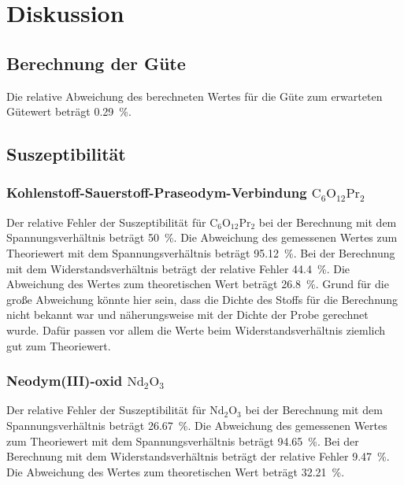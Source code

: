 \section{Diskussion}
\label{sec:Diskussion}

\subsection{Berechnung der Güte}
Die relative Abweichung des berechneten Wertes für die Güte zum erwarteten Gütewert beträgt \SI{0.29}{\percent}. 

\subsection{Suszeptibilität}
\subsubsection{Kohlenstoff-Sauerstoff-Praseodym-Verbindung $\text{C}_6 \text{O}_{12} \text{Pr}_2$}
Der relative Fehler der Suszeptibilität für $\text{C}_6 \text{O}_{12} \text{Pr}_2$ bei der Berechnung mit dem Spannungsverhältnis beträgt \SI{50}{\percent}. 
Die Abweichung des gemessenen Wertes zum Theoriewert mit dem Spannungsverhältnis beträgt \SI{95.12}{\percent}.
\newline
Bei der Berechnung mit dem Widerstandsverhältnis beträgt der relative Fehler \SI{44.4}{\percent}.
Die Abweichung des Wertes zum theoretischen Wert beträgt \SI{26.8}{\percent}.
\newline
Grund für die große Abweichung könnte hier sein, dass die Dichte des Stoffs für die Berechnung nicht bekannt war und 
näherungsweise mit der Dichte der Probe gerechnet wurde. 
Dafür passen vor allem die Werte beim Widerstandsverhältnis ziemlich gut zum Theoriewert.

\subsubsection{Neodym(III)-oxid $\text{Nd}_2 \text{O}_3$}
Der relative Fehler der Suszeptibilität für $\text{Nd}_2 \text{O}_3$ bei der Berechnung mit dem Spannungsverhältnis beträgt \SI{26.67}{\percent}. 
Die Abweichung des gemessenen Wertes zum Theoriewert mit dem Spannungsverhältnis beträgt \SI{94.65}{\percent}.
\newline
Bei der Berechnung mit dem Widerstandsverhältnis beträgt der relative Fehler \SI{9.47}{\percent}.
Die Abweichung des Wertes zum theoretischen Wert beträgt \SI{32.21}{\percent}.

